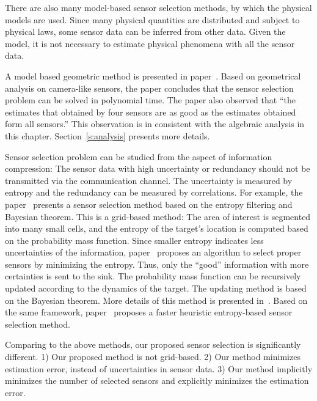 There are also many model-based sensor selection methods, by which the physical models are used. Since many physical quantities are distributed and subject to physical laws, some sensor data can be inferred from other data. Given the model, it is not necessary to estimate physical phenomena with all the sensor data.


A model based geometric method is presented in paper~\cite{isler06tase}.
Based on geometrical analysis on camera-like sensors, the paper concludes that the sensor selection problem can be solved in polynomial time. The paper also observed that ``the estimates that obtained by four sensors are as good as the estimates obtained form all sensors.'' This observation is in consistent with the algebraic analysis in this chapter. Section~\ref{s:analysis} presents more details.


Sensor selection problem can be studied from the aspect of information compression: The sensor data with high uncertainty or redundancy should not be transmitted via the communication channel. The uncertainty is measured by entropy and the redundancy can be measured by correlations. For example, the paper~\cite{FZhaoShinInfoDrivenDynamicTracking} presents a sensor selection method based on the entropy filtering and Bayesian theorem. This is a grid-based method: The area of interest is segmented into many small cells, and the entropy of the target's location is computed based on the probability mass function. Since smaller entropy indicates less uncertainties of the information, paper~\cite{FZhaoShinInfoDrivenDynamicTracking} proposes an algorithm to select proper sensors by minimizing the entropy. Thus, only the ``good'' information with more certainties is sent to the sink. The probability mass function can be recursively updated according to the dynamics of the target. The updating method is based on the Bayesian theorem. More details of this method is presented in~\cite{liu02collaborative,zhao03collaborative,ZhaoGuibasWSN2004}. Based on the same framework, paper~\cite{wang04entropybased} proposes a faster heuristic entropy-based sensor selection method.


Comparing to the above methods, our proposed sensor selection is significantly different. 1) Our proposed method is not grid-based. 2) Our method minimizes estimation error, instead of uncertainties in sensor data. 3) Our method implicitly minimizes the number of selected sensors and explicitly minimizes the estimation error.


